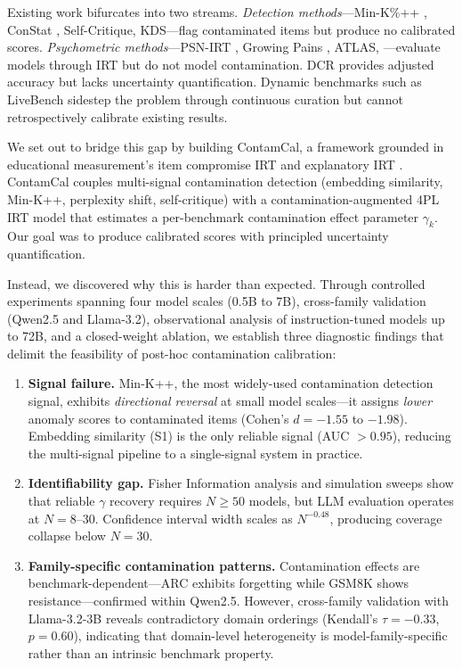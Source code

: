 \documentclass[11pt,a4paper]{article}
\newcommand{\gam}{\gamma}
\begin{document}
Existing work bifurcates into two streams.
\emph{Detection methods}---Min-K\%++ \citep{shi2024detecting}, ConStat \citep{dekoninck2024constat}, Self-Critique, KDS---flag contaminated items but produce no calibrated scores.
\emph{Psychometric methods}---PSN-IRT \citep{martinez2024item}, Growing Pains \citep{burnell2023rethinking}, ATLAS, \citet{lalor2024benchmarking}---evaluate models through IRT but do not model contamination.
DCR \citep{oren2024proving} provides adjusted accuracy but lacks uncertainty quantification.
Dynamic benchmarks such as LiveBench \citep{white2024livebench} sidestep the problem through continuous curation but cannot retrospectively calibrate existing results.

We set out to bridge this gap by building ContamCal, a framework grounded in educational measurement's item compromise IRT \citep{eckerly2017detecting,sinharay2017assessment} and explanatory IRT \citep{de2004explanatory}.
ContamCal couples multi-signal contamination detection (embedding similarity, Min-K++, perplexity shift, self-critique) with a contamination-augmented 4PL IRT model that estimates a per-benchmark contamination effect parameter $\gam_k$.
Our goal was to produce calibrated scores with principled uncertainty quantification.

Instead, we discovered why this is harder than expected.
Through controlled experiments spanning four model scales (0.5B to 7B), cross-family validation (Qwen2.5 and Llama-3.2), observational analysis of instruction-tuned models up to 72B, and a closed-weight ablation, we establish three diagnostic findings that delimit the feasibility of post-hoc contamination calibration:

\begin{enumerate}
    \item \textbf{Signal failure.} Min-K++, the most widely-used contamination detection signal, exhibits \emph{directional reversal} at small model scales---it assigns \emph{lower} anomaly scores to contaminated items (Cohen's $d = -1.55$ to $-1.98$). Embedding similarity (S1) is the only reliable signal (AUC $> 0.95$), reducing the multi-signal pipeline to a single-signal system in practice.

    \item \textbf{Identifiability gap.} Fisher Information analysis and simulation sweeps show that reliable $\gam$ recovery requires $N \geq 50$ models, but LLM evaluation operates at $N = 8$--$30$. Confidence interval width scales as $N^{-0.48}$, producing coverage collapse below $N = 30$.

    \item \textbf{Family-specific contamination patterns.} Contamination effects are benchmark-dependent---ARC exhibits forgetting while GSM8K shows resistance---confirmed within Qwen2.5. However, cross-family validation with Llama-3.2-3B reveals contradictory domain orderings (Kendall's $\tau = -0.33$, $p = 0.60$), indicating that domain-level heterogeneity is model-family-specific rather than an intrinsic benchmark property.
\end{enumerate}
\end{document}
